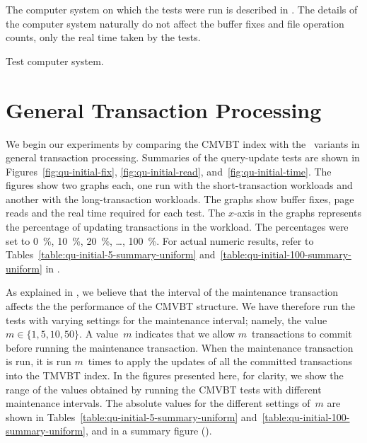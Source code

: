 The computer system on which the tests were run is described in
.
The details of the computer system naturally do not affect the buffer fixes
and file  operation counts, only the real time taken by the tests.

\begin{table}
\begin{center}

\caption{Test computer system.}
\label{table:computer-system}
\end{center}
\end{table}



\section{General Transaction Processing}
\label{sec:performance:general}

We begin our experiments by comparing the CMVBT index with the \TSBtree\ 
variants in general transaction processing. 
Summaries of the query-update tests are shown in
Figures~\ref{fig:qu-initial-fix}, \ref{fig:qu-initial-read},
and~\ref{fig:qu-initial-time}.
The figures show two graphs each, one run with the short-transaction
workloads and another with the long-transaction workloads.
The graphs show buffer fixes, page reads and the real time required for each
test. 
The \mbox{$x$-axis} in the graphs represents the percentage of updating
transactions in the workload. 
The percentages were set to \SI{0}{\percent}, \SI{10}{\percent},
\SI{20}{\percent}, \ldots, \SI{100}{\percent}. 
For actual numeric results, refer to
Tables~\ref{table:qu-initial-5-summary-uniform}
and~\ref{table:qu-initial-100-summary-uniform} in
.

As explained in , we believe that
the interval of the maintenance transaction affects the the performance of
the CMVBT structure. 
We have therefore run the tests with varying settings for the
maintenance interval; namely, the value $m \in \{1, 5, 10, 50\}$.
A value~$m$ indicates that we allow $m$~transactions to commit before
running the maintenance transaction.
When the maintenance transaction is run, it is run $m$~times to apply
the updates of all the committed transactions into the TMVBT index.
In the figures presented here, for clarity, we show the range of the
values obtained by running the CMVBT tests with different maintenance
intervals.
The absolute values for the different settings of~$m$ are shown in 
Tables~\ref{table:qu-initial-5-summary-uniform}
and~\ref{table:qu-initial-100-summary-uniform}, and in a summary figure
(\figref{fig:cm-initial-fix}).

